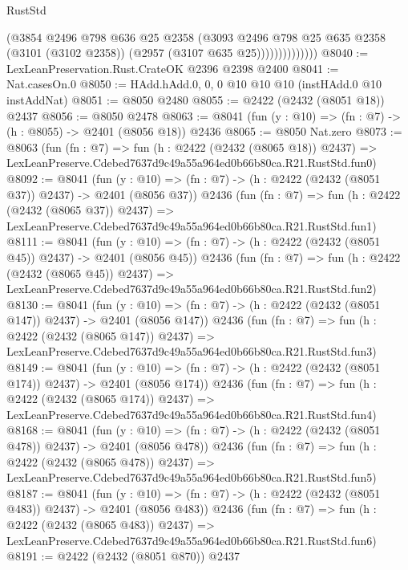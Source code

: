 \begin{lexlean}{RustStd}
\begin{coremodule}
                        (@3854
                          @2496
                          @798
                          @636
                          @25
                          @2358
                          (@3093
                            @2496
                            @798
                            @25
                            @635
                            @2358
                            (@3101 (@3102 @2358))
                            (@2957 (@3107 @635 @25))))))))))))))
@8040 := LexLeanPreservation.Rust.CrateOK @2396 @2398 @2400
@8041 := Nat.casesOn.{0}
@8050 := HAdd.hAdd.{0, 0, 0} @10 @10 @10 (instHAdd.{0} @10 instAddNat)
@8051 := @8050 @2480
@8055 := @2422 (@2432 (@8051 @18)) @2437
@8056 := @8050 @2478
@8063 := @8041 (fun (y : @10) => (fn : @7) -> (h : @8055) -> @2401 (@8056 @18)) @2436
@8065 := @8050 Nat.zero
@8073 := @8063
    (fun (fn : @7) =>
    fun (h : @2422 (@2432 (@8065 @18)) @2437) =>
    LexLeanPreserve.Cdebed7637d9c49a55a964ed0b66b80ca.R21.RustStd.fun0)
@8092 := @8041
    (fun (y : @10) => (fn : @7) -> (h : @2422 (@2432 (@8051 @37)) @2437) -> @2401 (@8056 @37))
    @2436
    (fun (fn : @7) =>
    fun (h : @2422 (@2432 (@8065 @37)) @2437) =>
    LexLeanPreserve.Cdebed7637d9c49a55a964ed0b66b80ca.R21.RustStd.fun1)
@8111 := @8041
    (fun (y : @10) => (fn : @7) -> (h : @2422 (@2432 (@8051 @45)) @2437) -> @2401 (@8056 @45))
    @2436
    (fun (fn : @7) =>
    fun (h : @2422 (@2432 (@8065 @45)) @2437) =>
    LexLeanPreserve.Cdebed7637d9c49a55a964ed0b66b80ca.R21.RustStd.fun2)
@8130 := @8041
    (fun (y : @10) => (fn : @7) -> (h : @2422 (@2432 (@8051 @147)) @2437) -> @2401 (@8056 @147))
    @2436
    (fun (fn : @7) =>
    fun (h : @2422 (@2432 (@8065 @147)) @2437) =>
    LexLeanPreserve.Cdebed7637d9c49a55a964ed0b66b80ca.R21.RustStd.fun3)
@8149 := @8041
    (fun (y : @10) => (fn : @7) -> (h : @2422 (@2432 (@8051 @174)) @2437) -> @2401 (@8056 @174))
    @2436
    (fun (fn : @7) =>
    fun (h : @2422 (@2432 (@8065 @174)) @2437) =>
    LexLeanPreserve.Cdebed7637d9c49a55a964ed0b66b80ca.R21.RustStd.fun4)
@8168 := @8041
    (fun (y : @10) => (fn : @7) -> (h : @2422 (@2432 (@8051 @478)) @2437) -> @2401 (@8056 @478))
    @2436
    (fun (fn : @7) =>
    fun (h : @2422 (@2432 (@8065 @478)) @2437) =>
    LexLeanPreserve.Cdebed7637d9c49a55a964ed0b66b80ca.R21.RustStd.fun5)
@8187 := @8041
    (fun (y : @10) => (fn : @7) -> (h : @2422 (@2432 (@8051 @483)) @2437) -> @2401 (@8056 @483))
    @2436
    (fun (fn : @7) =>
    fun (h : @2422 (@2432 (@8065 @483)) @2437) =>
    LexLeanPreserve.Cdebed7637d9c49a55a964ed0b66b80ca.R21.RustStd.fun6)
@8191 := @2422 (@2432 (@8051 @870)) @2437

\end{coremodule}
\end{lexlean}
